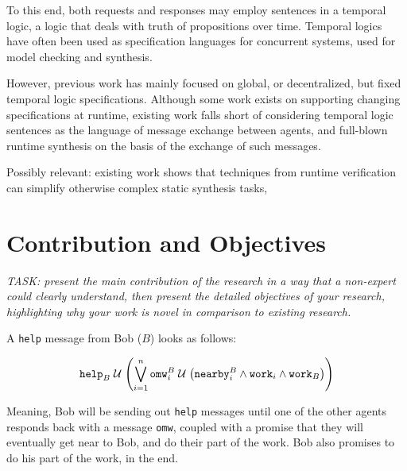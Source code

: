 \documentclass[conference]{IEEEtran}
\begin{document}
To this end, both requests and responses may employ sentences in a
temporal logic, a logic that deals with truth of propositions over
time\cite{1977-Temporal-Logic}. Temporal logics have often been used
as specification languages for concurrent systems, used for model
checking and
synthesis\cite{2021-Specification-Patterns-for-Robotic-Missions}.

However, previous work has mainly focused on global, or
decentralized\cite{2016-Multi-Agent-Planning-under-Local-LTL-Specs-and-Event-Based-Sync,
2018-Multi-robot-LTL-Planning-Under-Uncertainty}, but fixed temporal
logic specifications. Although some work exists on supporting changing
specifications at runtime\cite{2022-Live-Synthesis}, existing work
falls short of considering temporal logic sentences as the language of
message exchange between agents, and full-blown runtime synthesis on
the basis of the exchange of such messages.

Possibly relevant: existing work shows that techniques from runtime
verification can simplify otherwise complex static synthesis
tasks\cite{2022-Runtime-Verification-Meets-Controller-Synthesis},


\section{Contribution and Objectives}

\emph{TASK: present the main contribution of the research in a way
that a non-expert could clearly understand, then present the detailed
objectives of your research, highlighting why your work is novel in
comparison to existing research.}



A \texttt{help} message from Bob ($B$) looks as follows:

\begin{align}
\mathtt{help}_B \until %
\p{\bigvee_{i=1}^n %
  \mathtt{omw}_i^B \until %
  \p{\mathtt{nearby}_i^B \wedge \mathtt{work}_i \wedge \mathtt{work}_B} %
} %
\end{align}

Meaning, Bob will be sending out \texttt{help} messages until one of
the other agents responds back with a message \texttt{omw}, coupled
with a promise that they will eventually get near to Bob, and do their
part of the work. Bob also promises to do his part of the work, in the
end.
\end{document}
